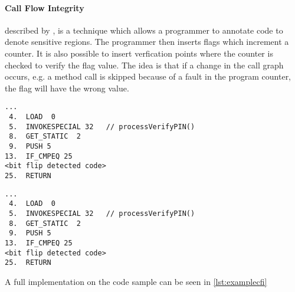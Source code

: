 \paragraph{Call Flow Integrity} described by \cite{agl}, is a technique which allows a programmer to annotate code to denote sensitive regions. The programmer then inserts flags which increment a counter. It is also possible to insert verfication points where the counter is checked to verify the flag value. The idea is that if a change in the call graph occurs, e.g. a method call is skipped because of a fault in the program counter, the flag will have the wrong value. 

\begin{lstlisting}[caption={Java code example of the control flow integrity countermeasure checking the control flow flag},label={lst:examplecfisnip}]
...
 4.  LOAD  0
 5.  INVOKESPECIAL 32   // processVerifyPIN()
 8.  GET_STATIC  2
 9.  PUSH 5
13.  IF_CMPEQ 25
<bit flip detected code>
25.  RETURN
\end{lstlisting}

\begin{lstlisting}[caption={Java code example of the control flow integrity countermeasure checking the control flow flag},label={lst:examplecfisnip}]
...
 4.  LOAD  0
 5.  INVOKESPECIAL 32   // processVerifyPIN()
 8.  GET_STATIC  2
 9.  PUSH 5
13.  IF_CMPEQ 25
<bit flip detected code>
25.  RETURN
\end{lstlisting}

A full implementation on the code sample can be seen in \cref{lst:examplecfi}
